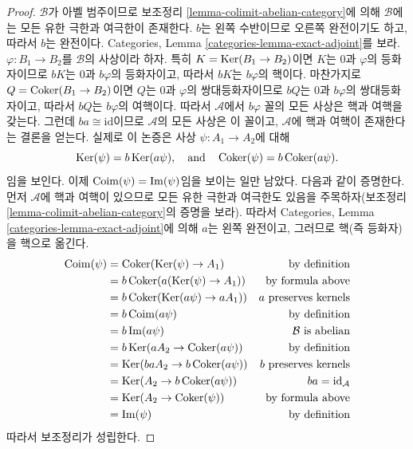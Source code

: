 \begin{proof}
$\mathcal{B}$가 아벨 범주이므로 보조정리
\ref{lemma-colimit-abelian-category}에 의해 $\mathcal{B}$에는 모든
유한 극한과 여극한이 존재한다. $b$는 왼쪽 수반이므로 오른쪽 완전이기도
하고, 따라서 $b$는 완전이다. Categories, Lemma
\ref{categories-lemma-exact-adjoint}를 보라.
$\varphi : B_1 \to B_2$를 $\mathcal{B}$의 사상이라 하자.
특히 $K = \mathop{\mathrm{Ker}}(B_1 \to B_2)$이면 $K$는 $0$과 $\varphi$의 등화자이므로
$bK$는 $0$과 $b\varphi$의 등화자이고, 따라서 $bK$는 $b\varphi$의
핵이다. 마찬가지로 $Q = \mathop{\mathrm{Coker}}(B_1 \to B_2)$이면 $Q$는 $0$과
$\varphi$의 쌍대등화자이므로 $bQ$는 $0$과 $b\varphi$의
쌍대등화자이고, 따라서 $bQ$는 $b\varphi$의 여핵이다.
따라서 $\mathcal{A}$에서 $b\varphi$ 꼴의 모든 사상은 핵과 여핵을
갖는다. 그런데 $ba \cong \text{id}$이므로 $\mathcal{A}$의 모든
사상은 이 꼴이고, $\mathcal{A}$에 핵과 여핵이 존재한다는 결론을
얻는다. 실제로 이 논증은 사상 $\psi : A_1 \to A_2$에 대해
$$
\mathop{\mathrm{Ker}}(\psi) = b\mathop{\mathrm{Ker}}(a\psi),
\quad\text{and}\quad
\mathop{\mathrm{Coker}}(\psi) = b\mathop{\mathrm{Coker}}(a\psi).
$$
임을 보인다. 이제 $\mathop{\mathrm{Coim}}(\psi)= \mathop{\mathrm{Im}}(\psi)$임을 보이는 일만 남았다.
다음과 같이 증명한다. 먼저 $\mathcal{A}$에 핵과 여핵이 있으므로 모든
유한 극한과 여극한도 있음을 주목하자(보조정리
\ref{lemma-colimit-abelian-category}의 증명을 보라).
따라서 Categories, Lemma \ref{categories-lemma-exact-adjoint}에 의해
$a$는 왼쪽 완전이고, 그러므로 핵(즉 등화자)을 핵으로 옮긴다.
\begin{align*}
\mathop{\mathrm{Coim}}(\psi)
& =
\mathop{\mathrm{Coker}}(\mathop{\mathrm{Ker}}(\psi) \to A_1)
& \text{by definition} \\
& =
b\mathop{\mathrm{Coker}}(a(\mathop{\mathrm{Ker}}(\psi) \to A_1))
& \text{by formula above} \\
& =
b\mathop{\mathrm{Coker}}(\mathop{\mathrm{Ker}}(a\psi) \to aA_1))
& a\text{ preserves kernels} \\
& =
b\mathop{\mathrm{Coim}}(a\psi)
& \text{by definition} \\
& =
b\mathop{\mathrm{Im}}(a\psi)
& \mathcal{B}\text{ is abelian} \\
& =
b\mathop{\mathrm{Ker}}(aA_2 \to \mathop{\mathrm{Coker}}(a\psi))
& \text{by definition} \\
& =
\mathop{\mathrm{Ker}}(baA_2 \to b\mathop{\mathrm{Coker}}(a\psi))
& b\text{ preserves kernels} \\
& =
\mathop{\mathrm{Ker}}(A_2 \to b\mathop{\mathrm{Coker}}(a\psi))
& ba = \text{id}_\mathcal{A} \\
& =
\mathop{\mathrm{Ker}}(A_2 \to \mathop{\mathrm{Coker}}(\psi))
& \text{by formula above} \\
& =
\mathop{\mathrm{Im}}(\psi)
& \text{by definition}
\end{align*}
따라서 보조정리가 성립한다.
\end{proof}




